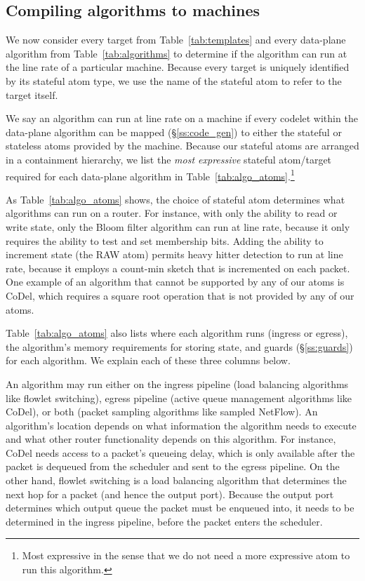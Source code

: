\subsection{Compiling \pktlanguage algorithms to \absmachine machines}
\label{domino_ss:compiler}
We now consider every target from Table~\ref{tab:templates} and every
data-plane algorithm from Table~\ref{tab:algorithms} to determine if the
algorithm can run at the line rate of a particular \absmachine machine. Because
every target is uniquely identified by its stateful atom type, we use the name
of the stateful atom to refer to the target itself.

We say an algorithm can run at line rate on a \absmachine machine if every
codelet within the data-plane algorithm can be mapped (\S\ref{ss:code_gen}) to
either the stateful or stateless atoms provided by the \absmachine machine.
Because our stateful atoms are arranged in a containment hierarchy, we list the
\textit{most expressive} stateful atom/target required for each data-plane
algorithm in Table~\ref{tab:algo_atoms}.\footnote{Most expressive in the sense
that we do not need a more expressive atom to run this algorithm.}


As Table~\ref{tab:algo_atoms} shows, the choice of stateful atom determines
what algorithms can run on a router. For instance, with only the ability to
read or write state, only the Bloom filter algorithm can run at line rate, because it only
requires the ability to test and set membership bits.  Adding the ability to
increment state (the RAW atom) permits heavy hitter detection to run at line
rate, because it employs a count-min sketch that is incremented on each packet.
One example of an algorithm that cannot be supported by any of our atoms is
CoDel, which requires a square root operation that is not provided by any of
our atoms.

Table~\ref{tab:algo_atoms} also lists where each algorithm runs (ingress or
egress), the algorithm's memory requirements for storing state, and guards
(\S\ref{ss:guards}) for each algorithm. We explain each of these three columns
below.

An algorithm may run either on the ingress pipeline (\eg load balancing
algorithms like flowlet switching), egress pipeline (\eg active queue
management algorithms like CoDel), or both (\eg packet sampling algorithms like
sampled NetFlow). An algorithm's location depends on what information the
algorithm needs to execute and what other router functionality depends on this
algorithm. For instance, CoDel needs access to a packet's queueing delay, which
is only available after the packet is dequeued from the scheduler and sent to
the egress pipeline. On the other hand, flowlet switching is a load balancing
algorithm that determines the next hop for a packet (and hence the output
port). Because the output port determines which output queue the packet must be
enqueued into, it needs to be determined in the ingress pipeline, before the
packet enters the scheduler.


